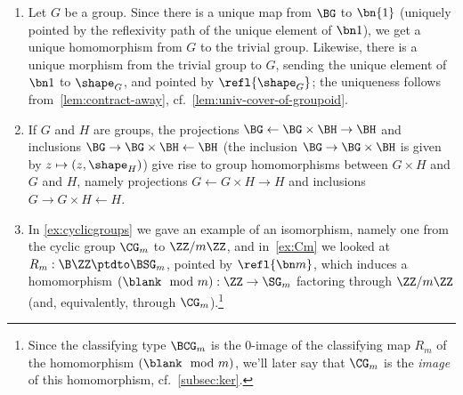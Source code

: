 \begin{example}
\begin{enumerate}
    In particular, we get homomorphisms of symmetric groups
    $\SG_m\to\SG_{m+n}$ and $\SG_m\to\SG_{mn}$, induced by identifications
    $\Fin(m+n) \eqto \Fin(m) \coprod \Fin(n)$ and
    $\Fin(mn) \eqto \Fin(m) \times \Fin(n)$.\footnote{%
      The latter identification is somewhat arbitrary, but
      let's say it's defined using the lexicographic ordering
      on the product.}
\item Let $G$ be a group.  Since there is a unique map from $\BG$ to
  $\bn{1} $ (uniquely pointed by the reflexivity path of the unique
  element of $\bn 1$), we get a unique homomorphism from $G$ to the
  trivial group.  Likewise, there is a unique morphism from the
  trivial group to $G$, sending the unique element of $\bn 1$ to
  $\shape_G$, and pointed by $\refl {\shape_G}$;
  the uniqueness follows from~\cref{lem:contract-away},
  cf.\ \cref{lem:univ-cover-of-groupoid}.
\item If $G$ and $H$ are groups, the projections $\BG\gets \BG\times \BH\to \BH$ and inclusions $\BG\to\BG\times\BH\gets\BH$
  (\eg the inclusion $\BG\to\BG\times\BH$ is given by $z\mapsto(z,\shape_H)$)
  give rise to group homomorphisms between $G\times H$ and $G$ and $H$,
  namely projections $G\gets G\times H\to H$ and inclusions
  $G\to G\times H\gets H$.
\item In \cref{ex:cyclicgroups} we gave an example of an isomorphism, 
  namely one from the cyclic group $\CG_m$ to $\ZZ/m\ZZ$,
  and in~\cref{ex:Cm} we looked at $R_m : \B\ZZ \ptdto \BSG_m$,
  pointed by $\refl{\bn m}$,
  which induces a homomorphism $(\blank\mod m) : \ZZ \to \SG_m$
  factoring through $\ZZ/m\ZZ$ (and, equivalently, through $\CG_m$).\footnote{%
    Since the classifying type $\BCG_m$ is the $0$-image
    of the classifying map $R_m$ of the homomorphism $(\blank\mod m)$, 
    we'll later say that $\CG_m$ is the \emph{image} of this homomorphism,   
  cf.~\cref{subsec:ker}.}\qedhere
  \end{enumerate}
\end{example}


